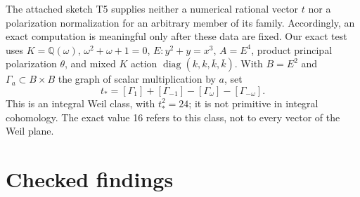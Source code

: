 \documentclass[11pt]{article}
\theoremstyle{remark}
\newcommand{\Q}{\mathbb Q}
\newcommand{\diag}{\operatorname{diag}}
\begin{document}
The attached sketch T5 supplies neither a numerical rational vector $t$ nor a polarization normalization for an arbitrary member of its family. Accordingly, an exact computation is meaningful only after these data are fixed. Our exact test uses $K=\Q(\omega)$, $\omega^2+\omega+1=0$, $E:y^2+y=x^3$, $A=E^4$, product principal polarization $\theta$, and mixed $K$ action $\diag(k,k,\bar k,\bar k)$. With $B=E^2$ and $\Gamma_a\subset B\times B$ the graph of scalar multiplication by $a$, set
\[
t_*=[\Gamma_1]+[\Gamma_{-1}]-[\Gamma_\omega]-[\Gamma_{-\omega}].
\]
This is an integral Weil class, with $t_*^2=24$; it is not primitive in integral cohomology. The exact value 16 refers to this class, not to every vector of the Weil plane.

\part{Checked findings}






\end{document}
